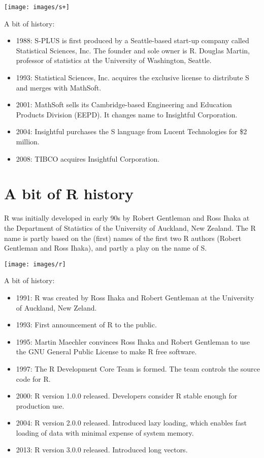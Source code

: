 \documentclass[]{book}
\providecommand{\tightlist}{%
  \setlength{\itemsep}{0pt}\setlength{\parskip}{0pt}}
\def\tightlist{}
\begin{document}
\begin{center}\texttt{[image: images/s+]} \end{center}

A bit of history:

\begin{itemize}
\tightlist
\item
  1988: S-PLUS is first produced by a Seattle-based start-up company
  called Statistical Sciences, Inc. The founder and sole owner is R.
  Douglas Martin, professor of statistics at the University of
  Washington, Seattle.
\item
  1993: Statistical Sciences, Inc. acquires the exclusive license to
  distribute S and merges with MathSoft.
\item
  2001: MathSoft sells its Cambridge-based Engineering and Education
  Products Division (EEPD). It changes name to Insightful Corporation.
\item
  2004: Insightful purchases the S language from Lucent Technologies for
  \$2 million.
\item
  2008: TIBCO acquires Insightful Corporation.
\end{itemize}

\section{A bit of R history}\label{a-bit-of-r-history}

R was initially developed in early 90s by Robert Gentleman and Ross
Ihaka at the Department of Statistics of the University of Auckland, New
Zealand. The R name is partly based on the (first) names of the first
two R authors (Robert Gentleman and Ross Ihaka), and partly a play on
the name of S.

\begin{center}\texttt{[image: images/r]} \end{center}

A bit of history:

\begin{itemize}
\tightlist
\item
  1991: R was created by Ross Ihaka and Robert Gentleman at the
  University of Auckland, New Zeland.
\item
  1993: First announcement of R to the public.
\item
  1995: Martin Maechler convinces Ross Ihaka and Robert Gentleman to use
  the GNU General Public License to make R free software.
\item
  1997: The R Development Core Team is formed. The team controls the
  source code for R.
\item
  2000: R version 1.0.0 released. Developers consider R stable enough
  for production use.
\item
  2004: R version 2.0.0 released. Introduced lazy loading, which enables
  fast loading of data with minimal expense of system memory.
\item
  2013: R version 3.0.0 released. Introduced long vectors.
\end{itemize}
\end{document}
